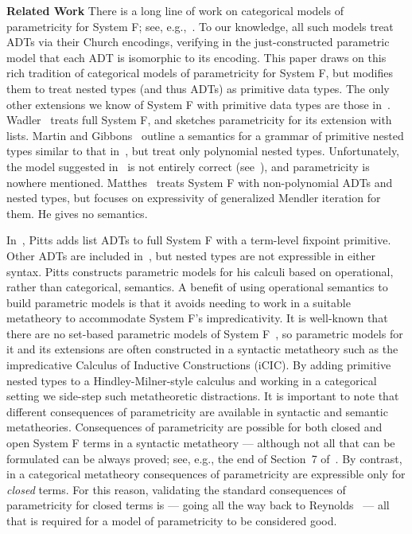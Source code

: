 \documentclass[runningheads]{llncs}
\begin{document}
\noindent
{\bf Related Work}\/ There is a long line of work on categorical
models of parametricity for System F; see,
e.g.,~\cite{bfss90,bm05,dr04,gjfor15,has94,jac99,mr92,rr94}.  To our
knowledge, all such models treat ADTs via their Church encodings,
verifying in the just-constructed parametric model that each ADT is
isomorphic to its encoding. This paper draws on this rich tradition of
categorical models of parametricity for System F, but modifies them to
treat nested types (and thus ADTs) as primitive data types. The only
other extensions we know of System F with primitive data types are
those in~\cite{mat11,mg01,pit98,pit00,wad89}.  Wadler~\cite{wad89}
treats full System F, and sketches parametricity for its extension
with lists. Martin and Gibbons~\cite{mg01} outline a semantics for a
grammar of primitive nested types similar to that in~\cite{jp19}, but
treat only polynomial nested types. Unfortunately, the model
suggested in~\cite{mg01} is not entirely correct (see~\cite{jp19}),
and parametricity is nowhere mentioned.  Matthes~\cite{mat11} treats
System F with non-polynomial ADTs and nested types, but focuses on
expressivity of generalized Mendler iteration for them. He gives no
semantics.

In~\cite{pit00}, Pitts adds list ADTs to full System F with a
term-level fixpoint primitive. Other ADTs are included
in~\cite{pit98}, but nested types are not expressible in either
syntax. Pitts constructs parametric models for his calculi based on
operational, rather than categorical, semantics. A benefit of using
operational semantics to build parametric models is that it avoids
needing to work in a suitable metatheory to accommodate System F's
impredicativity. It is well-known that there are no set-based
parametric models of System F~\cite{rey84}, so parametric models for
it and its extensions are often constructed in a syntactic metatheory
such as the impredicative Calculus of Inductive Constructions (iCIC).
By adding primitive nested types to a Hindley-Milner-style calculus
and working in a categorical setting we side-step such metatheoretic
distractions. It is important to note that different consequences of
parametricity are available in syntactic and semantic
metatheories. Consequences of parametricity are possible for both
closed and open System F terms in a syntactic metatheory --- although
not all that can be formulated can be always proved; see, e.g., the
end of Section~7 of~\cite{bm98}. By contrast, in a categorical
metatheory consequences of parametricity are expressible only for {\em
  closed} terms. For this reason, validating the standard consequences
of parametricity for closed terms is --- going all the way back to
Reynolds~\cite{rey83} --- all that is required for a model of
parametricity to be considered good.
\end{document}

